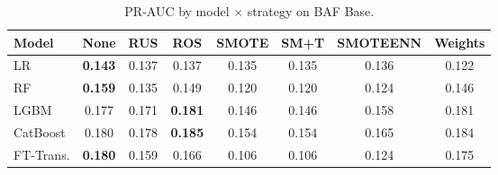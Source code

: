 \begin{table}[ht!]
\centering
\caption{PR-AUC by model $\times$ strategy on BAF Base.}
\label{tab:factorial_baf_prauc}
\begin{tabular}{l c c c c c c c}
\toprule
Model & None & RUS & ROS & SMOTE & SM+T & SMOTEENN & Weights \\
\midrule
LR         & \textbf{0.143} & 0.137 & 0.137 & 0.135 & 0.135 & 0.136 & 0.122 \\
RF         & \textbf{0.159} & 0.135 & 0.149 & 0.120 & 0.120 & 0.124 & 0.146 \\
LGBM       & 0.177 & 0.171 & \textbf{0.181} & 0.146 & 0.146 & 0.158 & 0.181 \\
CatBoost   & 0.180 & 0.178 & \textbf{0.185} & 0.154 & 0.154 & 0.165 & 0.184 \\
FT-Trans.  & \textbf{0.180} & 0.159 & 0.166 & 0.106 & 0.106 & 0.124 & 0.175 \\
\bottomrule
\end{tabular}
\end{table}